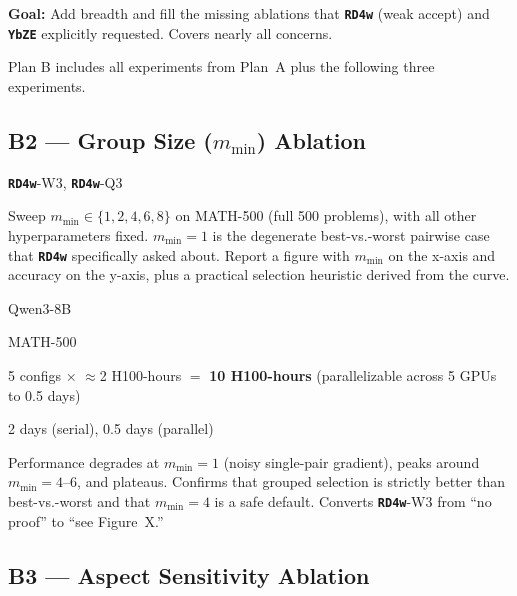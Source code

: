\documentclass[11pt,a4paper]{article}
\newcommand{\rev}[1]{\texttt{\textbf{#1}}}
\begin{document}
\textbf{Goal:} Add breadth and fill the missing ablations that \rev{RD4w} (weak accept) and
\rev{YbZE} explicitly requested. Covers nearly all concerns.

Plan B includes all experiments from Plan~A plus the following three experiments.

\subsection*{B2 --- Group Size ($m_{\min}$) Ablation}

\begin{description}[leftmargin=2cm, style=nextline]
  \item[Covers] \rev{RD4w}-W3, \rev{RD4w}-Q3
  \item[Procedure] Sweep $m_{\min} \in \{1, 2, 4, 6, 8\}$ on MATH-500 (full 500 problems), with
    all other hyperparameters fixed. $m_{\min}=1$ is the degenerate best-vs.-worst pairwise
    case that \rev{RD4w} specifically asked about. Report a figure with $m_{\min}$ on the x-axis
    and accuracy on the y-axis, plus a practical selection heuristic derived from the curve.
  \item[Model] Qwen3-8B
  \item[Benchmark] MATH-500
  \item[GPU estimate] 5 configs $\times$ $\approx$2 H100-hours $=$ \textbf{10 H100-hours}
    (parallelizable across 5 GPUs to 0.5 days)
  \item[Wall-clock] 2 days (serial), 0.5 days (parallel)
  \item[Expected outcome] Performance degrades at $m_{\min}=1$ (noisy single-pair gradient),
    peaks around $m_{\min}=4$--6, and plateaus. Confirms that grouped selection is strictly
    better than best-vs.-worst and that $m_{\min}=4$ is a safe default. Converts
    \rev{RD4w}-W3 from ``no proof'' to ``see Figure~X.''
\end{description}

\subsection*{B3 --- Aspect Sensitivity Ablation}
\end{document}

